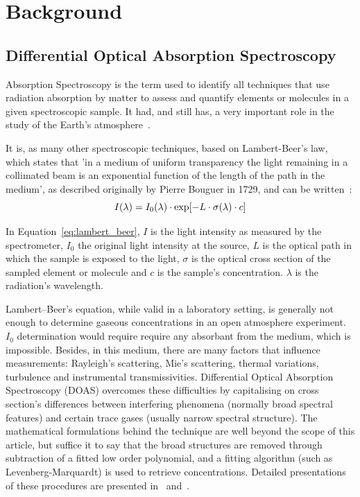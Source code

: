 \section{Background}
\label{sec:background}

\subsection{Differential Optical Absorption Spectroscopy}
\label{ssub:differential_optical_absorption_spectroscopy}
Absorption Spectroscopy is the term used to identify all techniques that
use radiation absorption by matter to assess and quantify elements or
molecules in a given spectroscopic sample. It had, and still has, a very
important role in the study of the Earth's atmosphere~\cite{Platt2007}.

It is, as many other spectroscopic techniques, based on Lambert-Beer's
law, which states that 'in a medium of uniform transparency the light
remaining in a collimated beam is an exponential function of the length
of the path in the medium', as described originally by Pierre Bouguer in
1729, and can be written~\cite{Platt2007}:
\begin{equation}
    \centering
    I(\lambda) = I_0(\lambda) \cdot \exp[-L \cdot \sigma(\lambda) \cdot c]
    \label{eq:lambert_beer}   
\end{equation}

In Equation~\ref{eq:lambert_beer}, $I$ is the light intensity as measured by the
spectrometer, $I_0$ the original light intensity at the source, $L$ is
the optical path in which the sample is exposed to the light, $\sigma$
is the optical cross section of the sampled element or molecule and $c$
is the sample's concentration. $\lambda$ is the radiation's wavelength.

Lambert--Beer's equation, while valid in a laboratory setting, is
generally not enough to determine gaseous concentrations in an open
atmosphere experiment. $I_0$ determination would require require any
absorbant from the medium, which is impossible. Besides, in this medium,
there are many factors that influence measurements: Rayleigh's
scattering, Mie's scattering, thermal variations, turbulence and
instrumental transmissivities. Differential Optical Absorption
Spectroscopy (DOAS) overcomes these difficulties by capitalising on
cross section's differences between interfering phenomena (normally
broad spectral features) and certain trace gases (usually narrow
spectral structure).  The mathematical formulations behind the technique
are well beyond the scope of this article, but suffice it to say that
the broad structures are removed through subtraction of a fitted low
order polynomial, and a fitting algorithm (such as Levenberg-Marquardt)
is used to retrieve concentrations. Detailed presentations of these
procedures are presented in~\cite{Platt2007} and~\cite{Merlaud2013}.

